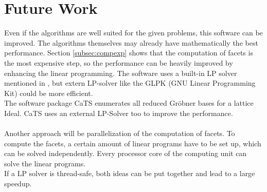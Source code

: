 \section{Future Work}
\label{sec:future}
Even if the algorithms are well suited for the given problems, this software can be improved.
The algorithms themselves may already have mathematically the best performance. 
Section \ref{subsec:compexp} shows that the computation of facets is the most expensive step, so the performance can be heavily improved by enhancing the linear programming.
The software uses a built-in LP solver mentioned in \cite{tigers}, but extern LP-solver like the GLPK (GNU Linear Programming Kit) could be more efficient. \\
The software package CaTS \cite{cats} enumerates all reduced Gröbner bases for a lattice Ideal. CaTS uses an external LP-Solver too to improve the performance.
\\\\
Another approach will be parallelization of the computation of facets. To compute the facets, a certain amount of linear programs have to be set up, which can be solved independently. Every processor core of the computing unit can solve the linear programs.\\
If a LP solver is thread-safe, both ideas can be put together and lead to a large speedup. 

\newpage